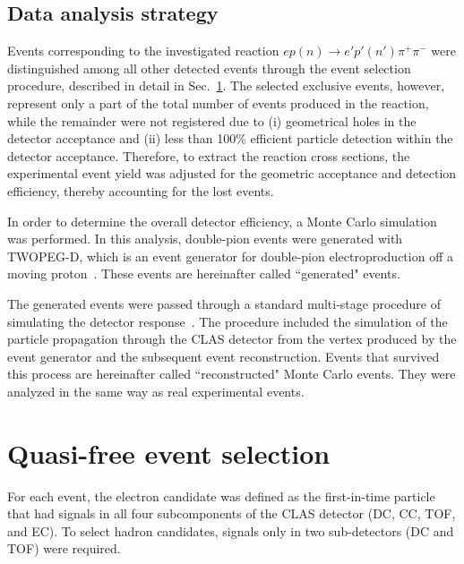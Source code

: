 \documentclass[prc,twocolumn,superscriptaddress,showpacs,amssymb,amsmath,amsfonts,aps,nofootinbib]{revtex4-1}
\begin{document}

\subsection{Data analysis strategy}
\label{Sect:clas_software}

Events corresponding to the investigated reaction $ep(n) \rightarrow e'p'(n')\pi^{+}\pi^{-}$ were distinguished among all other detected events through the event selection procedure, described in detail in Sec.\!~\ref{Sect:select}. The selected exclusive events,  however, represent only a part of the total number of events produced in the reaction, while the remainder were not registered due to (i) geometrical holes in the detector acceptance and (ii) less than 100\% efficient particle detection within the detector acceptance. Therefore, to extract the reaction cross sections, the experimental event yield was adjusted for the geometric acceptance and detection efficiency, thereby accounting for the lost events.

In order to determine the overall detector efficiency, a Monte Carlo simulation was performed. In this analysis, double-pion events were generated with TWOPEG-D, which is an event generator for double-pion electroproduction off a moving proton~\cite{twopeg-d}. These events are hereinafter called ``generated" events. 

The generated events were passed through a standard multi-stage procedure of simulating the detector response~\cite{Mecking:2003zu}. The procedure included the simulation of the particle propagation through the CLAS detector from the vertex produced by the event generator and the subsequent event reconstruction. Events that survived this process are hereinafter called ``reconstructed" Monte Carlo events. They were analyzed in the same way as real experimental events. 





\section{Quasi-free event selection}
\label{Sect:select}

For each event, the electron candidate was defined as the first-in-time particle that had signals in all four subcomponents of the CLAS detector (DC, CC, TOF, and EC). To select hadron candidates, signals only in two sub-detectors (DC and TOF) were required.
\end{document}
